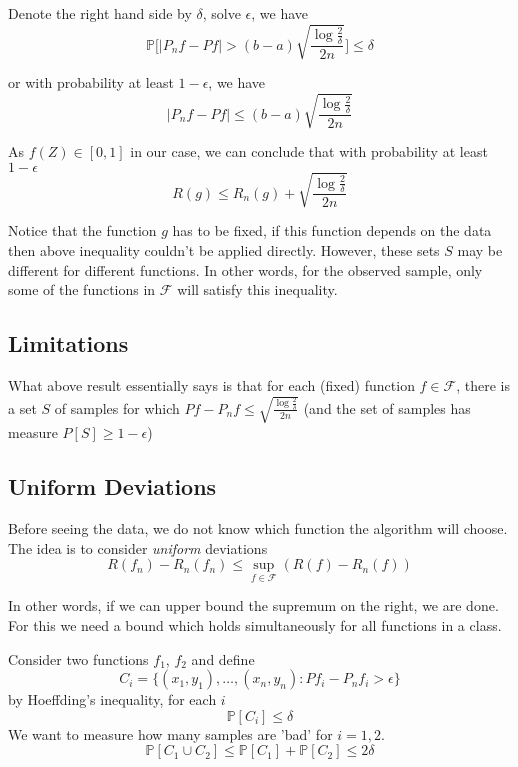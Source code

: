 \documentclass[12pt,reqno]{amsart}
\begin{document}
Denote the right hand side by $\delta$, solve $\epsilon$, we have
\begin{equation}
	\mathbb{P}\big[\big | P_n f - P f  \big | > (b-a) \sqrt{\frac{\log \frac{2}{\delta}}{2n}}\big] \leq \delta
\end{equation}

or with probability at least $1-\epsilon$, we have
\begin{equation}
	\big | P_nf - Pf  \big | \leq (b-a) \sqrt{\frac{\log \frac{2}{\delta}}{2n}}
\end{equation}

As $f(Z) \in [0, 1]$ in our case, we can conclude that with probability at least $1-\epsilon$
\begin{equation}
	R(g) \leq R_n(g) + \sqrt{\frac{\log \frac{2}{\delta}}{2n}}
\end{equation}

Notice that the function $g$ has to be fixed, if this function depends on the data then above inequality couldn't be applied directly. However, these sets $S$ may be different for different functions. In other words, for the observed sample, only some of the functions in $\mathcal{F}$ will satisfy this inequality.



\subsection{Limitations}
What above result essentially says is that for each (fixed) function $f\in \mathcal{F}$, there is a set $S$ of samples for which $Pf-P_nf \leq \sqrt{\frac{\log \frac{2}{\delta}}{2n}}$ (and the set of samples has measure $P[S] \geq 1 - \epsilon$)


\subsection{Uniform Deviations}

Before seeing the data, we do not know which function the algorithm will choose. The idea is to consider \textit{uniform} deviations
\begin{equation}
	R(f_n) - R_n(f_n) \leq \sup_{f\in \mathcal{F}} (R(f) - R_n(f))
\end{equation}

In other words, if we can upper bound the supremum on the right, we are done. For this we need a bound which holds simultaneously for all functions in a class.

Consider two functions $f_1$, $f_2$ and define
$$
	C_i = \{(x_1,y_1), \ldots , (x_n, y_n): Pf_i - P_nf_i > \epsilon\}
$$
by Hoeffding's inequality, for each $i$
$$
	\mathbb{P}[C_i] \leq \delta
$$
We want to measure how many samples are 'bad' for $i=1,2$.
$$
	\mathbb{P}[C_1\cup C_2] \leq \mathbb{P}[C_1] + \mathbb{P}[C_2] \leq 2\delta
$$
\end{document}

